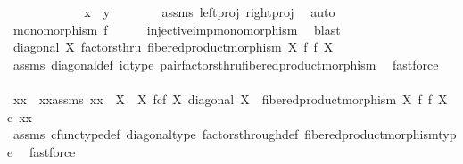 \begin{isabellebody}
\ \ \ \ \ \ \isanewline
\ \ \ \ \isamarkupfalse%
\ {\isachardoublequoteopen}x\ {\isacharequal}{\kern0pt}\ y{\isachardoublequoteclose}\isanewline
\ \ \ \ \ \ \isamarkupfalse%
\ assms{\isacharparenleft}{\kern0pt}{}{\isacharparenright}{\kern0pt}\ left{\isacharunderscore}{\kern0pt}proj\ right{\isacharunderscore}{\kern0pt}proj\ \isamarkupfalse%
\ auto\isanewline
\ \ \isamarkupfalse%
\isanewline
\ \ \isamarkupfalse%
\ \isamarkupfalse%
\ {\isachardoublequoteopen}monomorphism\ f{\isachardoublequoteclose}\isanewline
\ \ \ \ \isamarkupfalse%
\ injective{\isacharunderscore}{\kern0pt}imp{\isacharunderscore}{\kern0pt}monomorphism\ \isamarkupfalse%
\ blast\isanewline
{}\isamarkupfalse%
\isanewline
\ \ \isamarkupfalse%
\ {\isachardoublequoteopen}diagonal\ X\ factorsthru\ fibered{\isacharunderscore}{\kern0pt}product{\isacharunderscore}{\kern0pt}morphism\ X\ f\ f\ X{\isachardoublequoteclose}\isanewline
\ \ \ \ \isamarkupfalse%
\ assms{\isacharparenleft}{\kern0pt}{}{\isacharparenright}{\kern0pt}\ diagonal{\isacharunderscore}{\kern0pt}def\ id{\isacharunderscore}{\kern0pt}type\ pair{\isacharunderscore}{\kern0pt}factorsthru{\isacharunderscore}{\kern0pt}fibered{\isacharunderscore}{\kern0pt}product{\isacharunderscore}{\kern0pt}morphism\ \isamarkupfalse%
\ fastforce\isanewline
\ \ \isamarkupfalse%
\ \isamarkupfalse%
\ xx\ \ xx{\isacharunderscore}{\kern0pt}assms{\isacharcolon}{\kern0pt}\ {\isachardoublequoteopen}xx\ {\isacharcolon}{\kern0pt}\ X\ {\isasymrightarrow}\ X\ \isactrlbsub f\isactrlesub {\isasymtimes}\isactrlsub c\isactrlbsub f\isactrlesub \ X{\isachardoublequoteclose}\ {\isachardoublequoteopen}diagonal\ X\ {\isacharequal}{\kern0pt}\ fibered{\isacharunderscore}{\kern0pt}product{\isacharunderscore}{\kern0pt}morphism\ X\ f\ f\ X\ {\isasymcirc}\isactrlsub c\ xx{\isachardoublequoteclose}\isanewline
\ \ \ \ \isamarkupfalse%
\ assms{\isacharparenleft}{\kern0pt}{}{\isacharparenright}{\kern0pt}\ cfunc{\isacharunderscore}{\kern0pt}type{\isacharunderscore}{\kern0pt}def\ diagonal{\isacharunderscore}{\kern0pt}type\ factors{\isacharunderscore}{\kern0pt}through{\isacharunderscore}{\kern0pt}def\ fibered{\isacharunderscore}{\kern0pt}product{\isacharunderscore}{\kern0pt}morphism{\isacharunderscore}{\kern0pt}type\ \isamarkupfalse%
\ fastforce\isanewline
\ \ \isamarkupfalse%

\end{isabellebody}
